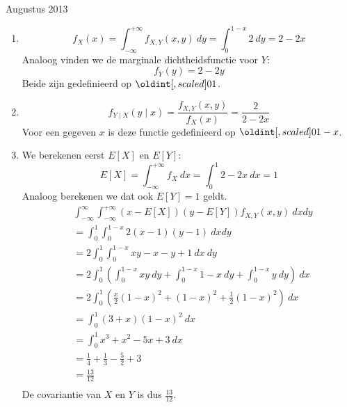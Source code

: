 \documentclass[main.tex]{subfiles}
\begin{document}
\begin{examenvraag}{Augustus 2013}
  \begin{ex-antwoord}
    \begin{enumerate}
    \item 
      \[ f_{X}(x) = \int_{-\infty}^{+\infty}f_{X,Y}(x,y)\ dy = \int_{0}^{1-x}2\ dy = 2-2x \]
      Analoog vinden we de marginale dichtheidsfunctie voor $Y$:
      \[ f_{Y}(y) = 2-2y\]
      Beide zijn gedefinieerd op $\interval{0}{1}$.
    \item
      \[ f_{Y\mid X}(y\mid x) = \frac{f_{X,Y}(x,y)}{f_{X}(x)} = \frac{2}{2-2x} \]
      Voor een gegeven $x$ is deze functie gedefinieerd op $\interval{0}{1-x}$.
    \item
      We berekenen eerst $E[X]$ en $E[Y]$:
      \[ E[X] = \int_{-\infty}^{+\infty}f_{X}\ dx = \int_{0}^{1}2-2x\ dx = 1 \]
      Analoog berekenen we dat ook $E[Y] = 1$ geldt.
      \begin{align*}
        &\int_{-\infty}^{\infty}\int_{-\infty}^{+\infty}(x-E[X])(y-E[Y])f_{X,Y}(x,y)\ dxdy\\
        &= \int_{0}^{1}\int_{0}^{1-x}2(x-1)(y-1)\ dxdy\\
        &= 2\int_{0}^{1}\int_{0}^{1-x}xy-x-y+1\ dx\ dy\\
        &= 2\int_{0}^{1}\left( \int_{0}^{1-x}xy\ dy + \int_{0}^{1-x}1-x\ dy +\int_{0}^{1-x}y\ dy \right)\ dx\\
        &= 2\int_{0}^{1}\left( \frac{x}{2}(1-x)^{2} + (1-x)^{2} + \frac{1}{2}(1-x)^{2} \right)\ dx\\
        &= \int_{0}^{1}(3+x)(1-x)^{2}\ dx\\
        &= \int_{0}^{1}x^{3} + x^{2} -5x + 3\ dx\\
        &= \frac{1}{4}+\frac{1}{3} - \frac{5}{2} + 3\\
        &= \frac{13}{12}\\
      \end{align*}
      De covariantie van $X$ en $Y$ is dus $\frac{13}{12}$.
    \end{enumerate}
  \end{ex-antwoord}
\end{examenvraag}
\end{document}
